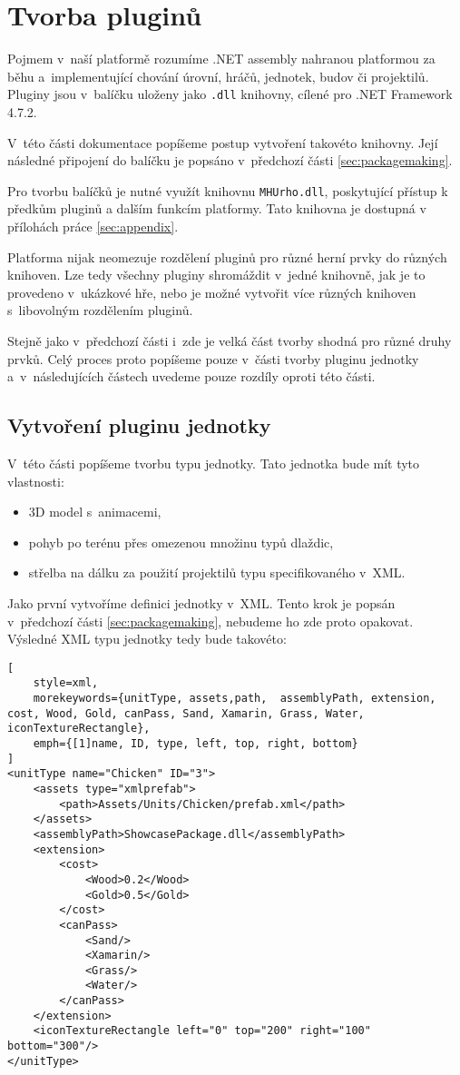 \chapter{Tvorba pluginů}
\label{sec:pluginmaking}
Pojmem  v~naší platformě rozumíme .NET assembly nahranou platformou za běhu a~implementující chování úrovní, hráčů, jednotek, budov či projektilů. Pluginy jsou v~balíčku uloženy jako \texttt{.dll} knihovny, cílené pro .NET Framework 4.7.2. 

V~této části dokumentace popíšeme postup vytvoření takovéto knihovny. Její následné připojení do balíčku je popsáno v~předchozí části \ref{sec:packagemaking}.

Pro tvorbu balíčků je nutné využít knihovnu \texttt{MHUrho.dll}, poskytující přístup k předkům pluginů a dalším funkcím platformy. Tato knihovna je dostupná v přílohách práce \ref{sec:appendix}.

Platforma nijak neomezuje rozdělení pluginů pro různé herní prvky do různých knihoven. Lze tedy všechny pluginy shromáždit v~jedné knihovně, jak je to provedeno v~ukázkové hře, nebo je možné vytvořit více různých knihoven s~libovolným rozdělením pluginů.

Stejně jako v~předchozí části i~zde je velká část tvorby shodná pro různé druhy prvků. Celý proces proto popíšeme pouze v~části tvorby pluginu jednotky a~v~následujících částech uvedeme pouze rozdíly oproti této části.


\section{Vytvoření pluginu jednotky}
\label{sec:unittypeplugin}
V~této části popíšeme tvorbu typu jednotky. Tato jednotka bude mít tyto vlastnosti:

\begin{itemize}
	\item 3D model s~animacemi,
	\item pohyb po terénu přes omezenou množinu typů dlaždic,
	\item střelba na dálku za použití projektilů typu specifikovaného v~XML.
\end{itemize}

Jako první vytvoříme definici jednotky v~XML. Tento krok je popsán v~předchozí části \ref{sec:packagemaking}, nebudeme ho zde proto opakovat. Výsledné XML typu jednotky tedy bude takovéto:

\begin{lstlisting}[
	style=xml,
	morekeywords={unitType, assets,path,  assemblyPath, extension, cost, Wood, Gold, canPass, Sand, Xamarin, Grass, Water, iconTextureRectangle},
	emph={[1]name, ID, type, left, top, right, bottom}
]
<unitType name="Chicken" ID="3">
	<assets type="xmlprefab">
		<path>Assets/Units/Chicken/prefab.xml</path>
	</assets>
	<assemblyPath>ShowcasePackage.dll</assemblyPath>
	<extension>
		<cost>
			<Wood>0.2</Wood>
			<Gold>0.5</Gold>
		</cost>
		<canPass>
			<Sand/>
			<Xamarin/>
			<Grass/>
			<Water/>
		</canPass>
	</extension>
	<iconTextureRectangle left="0" top="200" right="100" bottom="300"/>
</unitType>
\end{lstlisting}

